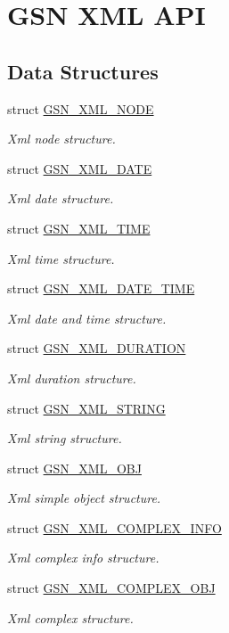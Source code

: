 \hypertarget{a00679}{
\section{GSN XML API}
\label{a00679}
}
\subsection*{Data Structures}
\begin{DoxyCompactItemize}
\item 
struct \hyperlink{a00434}{GSN\_\-XML\_\-NODE}
\begin{DoxyCompactList}\small\item\em Xml node structure. \end{DoxyCompactList}\item 
struct \hyperlink{a00431}{GSN\_\-XML\_\-DATE}
\begin{DoxyCompactList}\small\item\em Xml date structure. \end{DoxyCompactList}\item 
struct \hyperlink{a00437}{GSN\_\-XML\_\-TIME}
\begin{DoxyCompactList}\small\item\em Xml time structure. \end{DoxyCompactList}\item 
struct \hyperlink{a00432}{GSN\_\-XML\_\-DATE\_\-TIME}
\begin{DoxyCompactList}\small\item\em Xml date and time structure. \end{DoxyCompactList}\item 
struct \hyperlink{a00433}{GSN\_\-XML\_\-DURATION}
\begin{DoxyCompactList}\small\item\em Xml duration structure. \end{DoxyCompactList}\item 
struct \hyperlink{a00436}{GSN\_\-XML\_\-STRING}
\begin{DoxyCompactList}\small\item\em Xml string structure. \end{DoxyCompactList}\item 
struct \hyperlink{a00435}{GSN\_\-XML\_\-OBJ}
\begin{DoxyCompactList}\small\item\em Xml simple object structure. \end{DoxyCompactList}\item 
struct \hyperlink{a00429}{GSN\_\-XML\_\-COMPLEX\_\-INFO}
\begin{DoxyCompactList}\small\item\em Xml complex info structure. \end{DoxyCompactList}\item 
struct \hyperlink{a00430}{GSN\_\-XML\_\-COMPLEX\_\-OBJ}
\begin{DoxyCompactList}\small\item\em Xml complex structure. \end{DoxyCompactList}\end{DoxyCompactItemize}
